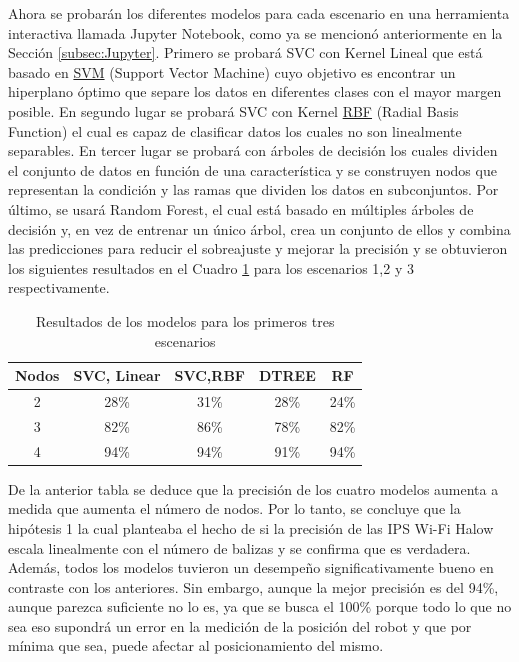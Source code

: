 Ahora se probarán los diferentes modelos para cada escenario en una herramienta interactiva llamada Jupyter Notebook, como ya se mencionó anteriormente en la Sección \ref{subsec:Jupyter}. Primero se probará SVC con Kernel Lineal que está basado en \hyperlink{SVM}{SVM} (Support Vector Machine) cuyo objetivo es encontrar un hiperplano óptimo que separe los datos en diferentes clases con el mayor margen posible. En segundo lugar se probará SVC con Kernel \hyperlink{RBF}{RBF} (Radial Basis Function) el cual es capaz de clasificar datos los cuales no son linealmente separables. En tercer lugar se probará con árboles de decisión los cuales dividen el conjunto de datos en función de una característica y se construyen nodos que representan la condición y las ramas que dividen los datos en subconjuntos. Por último, se usará Random Forest, el cual está basado en múltiples árboles de decisión y, en vez de entrenar un único árbol, crea un conjunto de ellos y combina las predicciones para reducir el sobreajuste y mejorar la precisión y se obtuvieron los siguientes resultados en el Cuadro \ref{cuadro:tabla2} para los escenarios 1,2 y 3 respectivamente.


\begin{table}[H]
\begin{center}
\begin{tabular}{|c|c|c|c|c|}
\hline
\textbf{Nodos} & \textbf{SVC, Linear} & \textbf{SVC,RBF} & \textbf{DTREE} & \textbf{RF} \\
\hline
2 & 28\% & 31\% & 28\% & 24\% \\  
3 & 82\% & 86\% & 78\% & 82\% \\   
4 & 94\% & 94\% & 91\% & 94\% \\   
\hline
\end{tabular}
\caption{Resultados de los modelos para los primeros tres escenarios}
\label{cuadro:tabla2}
\end{center}
\end{table}


De la anterior tabla se deduce que la precisión de los cuatro modelos aumenta a medida que aumenta el número de nodos. Por lo tanto, se concluye que la hipótesis 1 la cual planteaba el hecho de si la precisión de las IPS Wi-Fi Halow escala linealmente con el número de balizas y se confirma que es verdadera. Además, todos los modelos tuvieron un desempeño significativamente bueno en contraste con los anteriores. Sin embargo, aunque la mejor precisión es del 94\%, aunque parezca suficiente no lo es, ya que se busca el 100\% porque todo lo que no sea eso supondrá un error en la medición de la posición del robot y que por mínima que sea, puede afectar al posicionamiento del mismo.

